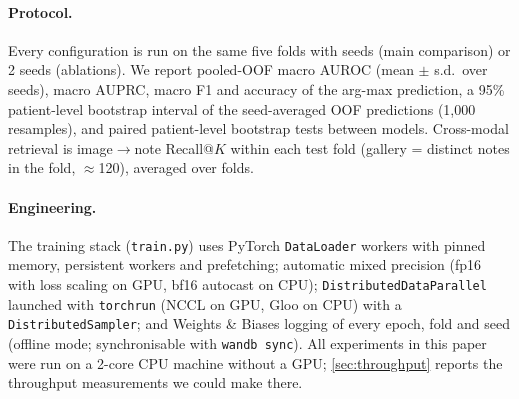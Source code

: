 \paragraph{Protocol.} Every configuration is run on the same five folds with \NSeedsMain{} seeds
(main comparison) or 2 seeds (ablations). We report pooled-OOF macro AUROC (mean $\pm$ s.d.\ over
seeds), macro AUPRC, macro F1 and accuracy of the arg-max prediction, a 95\% patient-level
bootstrap interval of the seed-averaged OOF predictions (1{,}000 resamples), and paired
patient-level bootstrap tests between models. Cross-modal retrieval is image$\to$note Recall@$K$
within each test fold (gallery = distinct notes in the fold, $\approx$120), averaged over folds.

\paragraph{Engineering.} The training stack (\texttt{train.py}) uses PyTorch \citep{paszke2019pytorch}
\texttt{DataLoader} workers with pinned memory, persistent workers and prefetching; automatic mixed
precision \citep{micikevicius2018mixed} (fp16 with loss scaling on GPU, bf16 autocast on CPU);
\texttt{DistributedDataParallel} \citep{li2020ddp} launched with \texttt{torchrun}
(NCCL on GPU, Gloo on CPU) with a \texttt{DistributedSampler}; and Weights \& Biases
\citep{biewald2020wandb} logging of every epoch, fold and seed (offline mode; synchronisable with
\texttt{wandb sync}). All experiments in this paper were run on a 2-core CPU machine without a GPU;
\cref{sec:throughput} reports the throughput measurements we could make there.
